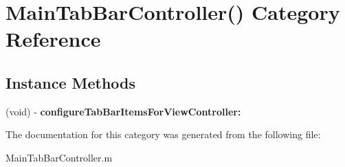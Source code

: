 \hypertarget{category_main_tab_bar_controller_07_08}{}\section{Main\+Tab\+Bar\+Controller() Category Reference}
\label{category_main_tab_bar_controller_07_08}
\subsection*{Instance Methods}
\begin{DoxyCompactItemize}
\item 
(void) -\/ {\bfseries configure\+Tab\+Bar\+Items\+For\+View\+Controller\+:}\hypertarget{category_main_tab_bar_controller_07_08_af4390b057c5c1d135afacae8b750961f}{}\label{category_main_tab_bar_controller_07_08_af4390b057c5c1d135afacae8b750961f}

\end{DoxyCompactItemize}


The documentation for this category was generated from the following file\+:\begin{DoxyCompactItemize}
\item 
Main\+Tab\+Bar\+Controller.\+m\end{DoxyCompactItemize}
